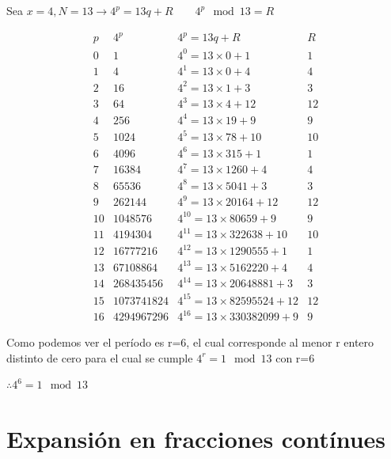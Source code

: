  Sea $x = 4, N = 13 \rightarrow 4^p = 13 q + R \qquad 4^p \mod 13 = R$

 \[\begin{matrix}
         p  &   4^p & 4^p = 13 q                         + R    &   R   \\
         0  &   1   & 4^0 = 13\times0                    + 1    & 1     \\
         1  &   4   & 4^1 = 13\times0                    + 4    & 4     \\
         2  &   16  & 4^2 = 13\times1                    + 3    & 3     \\
         3  &   64  & 4^3 = 13\times4                    + 12   & 12    \\
         4  &   256  & 4^4 = 13\times19                  + 9    & 9     \\
         5  &   1024  & 4^5 = 13\times78                 + 10   & 10    \\ %
         6  &   4096  & 4^6 = 13\times315                + 1    & 1     \\
         7  &   16384  & 4^7 = 13\times1260              + 4    & 4     \\
         8  &   65536  & 4^8 = 13\times5041              + 3    & 3     \\
         9  &   262144  & 4^9 = 13\times20164            + 12   & 12    \\
         10 &   1048576  & 4^10 = 13\times80659          + 9    & 9     \\
         11 &   4194304  & 4^11 = 13\times322638         + 10   & 10    \\
         12 &   16777216  & 4^12 = 13\times1290555       + 1    & 1     \\
         13 &   67108864  & 4^13 = 13\times5162220       + 4    & 4     \\
         14 &   268435456  & 4^14 = 13\times20648881     + 3    & 3     \\
         15 &   1073741824  & 4^15 = 13\times82595524    + 12   & 12    \\
         16 &   4294967296  & 4^16 = 13\times330382099   + 9    & 9     
     \end{matrix}
 \]

 Como podemos ver el período es r=6, el cual corresponde al menor r entero distinto de cero para el cual se cumple $4^r=1 \mod 13$ con r=6

 $\therefore 4^6 = 1 \mod 13$

\section{Expansión en fracciones contínues}

